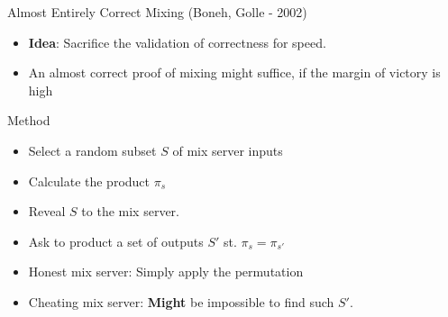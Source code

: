 \documentclass{beamer}
\begin{document}
\begin{frame}[allowframebreaks]{Almost Entirely Correct Mixing (Boneh, Golle - 2002)}

\begin{itemize}
\item \textbf{Idea}: Sacrifice the validation of correctness for speed.
\item An almost correct proof of mixing might suffice, if the margin of victory is high
\end{itemize}

\begin{block}{Method}
\begin{itemize}
\item Select a random subset $S$ of mix server inputs
\item Calculate the product $\pi_s$
\item Reveal $S$ to the mix server.
\item Ask to product a set of outputs $S'$ st. $\pi_s = \pi_{s'}$
\item Honest mix server:  Simply apply the permutation
\item Cheating mix server: \textbf{Might} be impossible to find such $S'$.
\end{itemize}
\end{block}


\end{frame}
\end{document}
